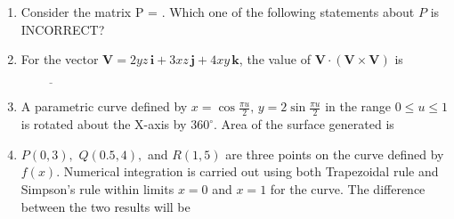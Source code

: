 \documentclass[journal]{IEEEtran}
\begin{document}
\begin{enumerate}[leftmargin=0pt]
    \item Consider the matrix P = . Which one of the following statements about $P$ is INCORRECT?
    \begin{enumerate}
    \end{enumerate}

    \item For the vector $\mathbf{V} = 2yz\,\mathbf{i} + 3xz\,\mathbf{j} + 4xy\,\mathbf{k}$, the value of $\mathbf{V} \cdot (\mathbf{V} \times \mathbf{V})$ is $\underline{\hspace{2cm}}$

    \item A parametric curve defined by $x = \cos \frac{\pi u}{2},\,y = 2\sin\frac{\pi u}{2}$ in the range $0 \leq u \leq 1$ is rotated about the X-axis by $360^\circ$. Area of the surface generated is
    \begin{enumerate}
    \end{enumerate}

    \item $P(0,3),$ $Q(0.5,4),$ and $R(1,5)$ are three points on the curve defined by $f(x)$. Numerical integration is carried out using both Trapezoidal rule and Simpson's rule within limits $x = 0$ and $x = 1$ for the curve. The difference between the two results will be
    \begin{enumerate}
    \end{enumerate}


\end{enumerate}
\end{document}
